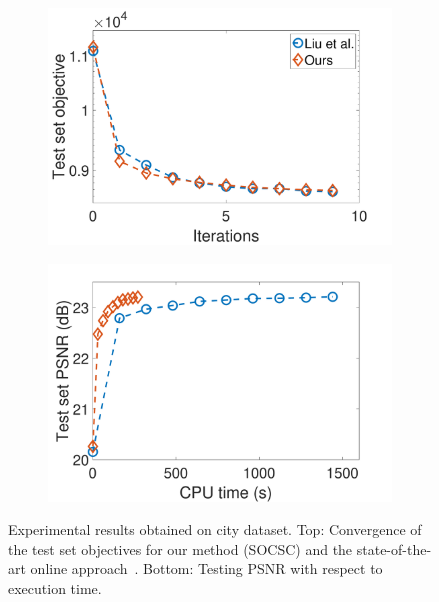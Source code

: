 \begin{figure}[h]
\centering
\begin{subfigure}{0.5\textwidth}
  \includegraphics[width=1\linewidth]{figure/onlineVSliu-ite.pdf}
\end{subfigure}
\begin{subfigure}{0.5\textwidth}
  \includegraphics[width=1\linewidth]{figure/onlineVSliu-time.pdf}
\end{subfigure}

\caption{Experimental results obtained on city dataset. Top: Convergence of the test set objectives for our method (SOCSC) and the state-of-the-art online approach~\cite{liu-2018-first}. Bottom: Testing PSNR with respect to execution time.}
\label{fig:onlineSmall-city}
\end{figure}

